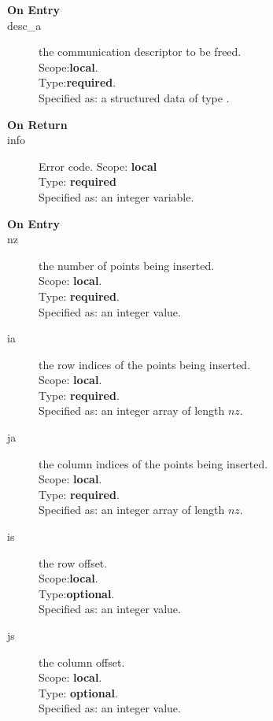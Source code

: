 %
%


\begin{description}
\item[\bf On Entry]
\item[desc\_a] the communication descriptor to be freed.\\
Scope:{\bf local}.\\
Type:{\bf required}.\\
Specified as: a structured data of type \descdata.
\end{description}

\begin{description}
\item[\bf On Return]
\item[info] Error code.
Scope: {\bf local} \\
Type: {\bf required}\\
Specified as: an integer variable.
\end{description}


%
%


\begin{description}
\item[\bf On Entry]
\item[nz] the number of points being inserted.\\
Scope: {\bf local}.\\
Type: {\bf required}.\\
Specified as: an integer value.
\item[ia] the row indices of the points being inserted.\\
Scope: {\bf local}.\\
Type: {\bf required}.\\
Specified as: an integer array of length $nz$.
\item[ja] the column indices of the points being inserted.\\
Scope: {\bf local}.\\
Type: {\bf required}.\\
Specified as: an integer array of length $nz$.
\item[is] the row offset.\\
Scope:{\bf local}.\\
Type:{\bf optional}.\\
Specified as: an integer value.
\item[js] the column offset.\\
Scope: {\bf local}.\\
Type: {\bf optional}.\\
Specified as: an integer value.
\end{description}

